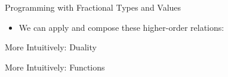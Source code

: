 \documentclass[11pt]{beamer}
\begin{document}
\begin{frame}{Programming with Fractional Types and Values}

\begin{itemize}

\vfill\item We can apply and compose these higher-order relations:

% 

\end{itemize}

\vfill

\end{frame}

\begin{frame}{More Intuitively: Duality}

\begin{center}
\end{center}

\end{frame}

\begin{frame}{More Intuitively: Functions}

\begin{center}
\end{center}

\end{frame}
\end{document}
